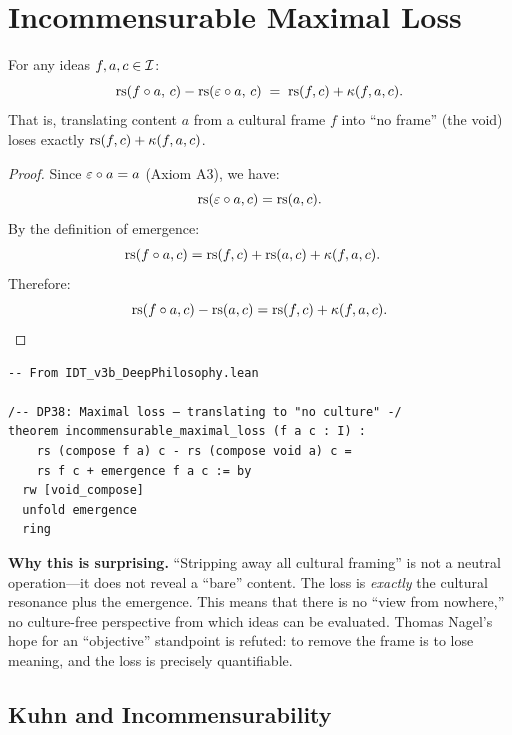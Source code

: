 \section{Incommensurable Maximal Loss}

\begin{theorem}
\label{thm:incommensurable-loss}
For any ideas $f, a, c \in \mathcal{I}$:
\[
\mathrm{rs}(f \circ a,\, c) - \mathrm{rs}(\varepsilon \circ a,\, c)
\;=\; \mathrm{rs}(f, c) + \kappa(f, a, c).
\]
That is, translating content $a$ from a cultural frame $f$ into ``no frame''
(the void) loses exactly $\mathrm{rs}(f, c) + \kappa(f, a, c)$.
\end{theorem}

\begin{proof}
Since $\varepsilon \circ a = a$ (Axiom A3), we have:
\[
\mathrm{rs}(\varepsilon \circ a, c) = \mathrm{rs}(a, c).
\]
By the definition of emergence:
\begin{align*}
\mathrm{rs}(f \circ a, c)
&= \mathrm{rs}(f, c) + \mathrm{rs}(a, c) + \kappa(f, a, c).
\end{align*}
Therefore:
\[
\mathrm{rs}(f \circ a, c) - \mathrm{rs}(a, c) = \mathrm{rs}(f, c) + \kappa(f, a, c).
\]
\end{proof}

\begin{lstlisting}
-- From IDT_v3b_DeepPhilosophy.lean

/-- DP38: Maximal loss — translating to "no culture" -/
theorem incommensurable_maximal_loss (f a c : I) :
    rs (compose f a) c - rs (compose void a) c =
    rs f c + emergence f a c := by
  rw [void_compose]
  unfold emergence
  ring
\end{lstlisting}

\begin{surprisebox}
\noindent\textbf{Why this is surprising.}
``Stripping away all cultural framing'' is not a neutral operation---it
does not reveal a ``bare'' content.  The loss is \emph{exactly} the
cultural resonance plus the emergence.  This means that there is no
``view from nowhere,'' no culture-free perspective from which ideas can
be evaluated.  Thomas Nagel's hope for an ``objective'' standpoint is
refuted: to remove the frame is to lose meaning, and the loss is
precisely quantifiable.
\end{surprisebox}

\subsection{Kuhn and Incommensurability}


